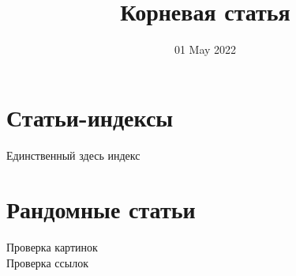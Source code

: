 
\title{Корневая статья}
\author{}
\date{01 May 2022}

\maketitle
\section{Статьи-индексы}
\begin{description}
    \item[Единственный здесь индекс] 
\end{description}
\section{Рандомные статьи}
\begin{description}
    \item[Проверка картинок] 
    \item[Проверка ссылок]  
\end{description}
